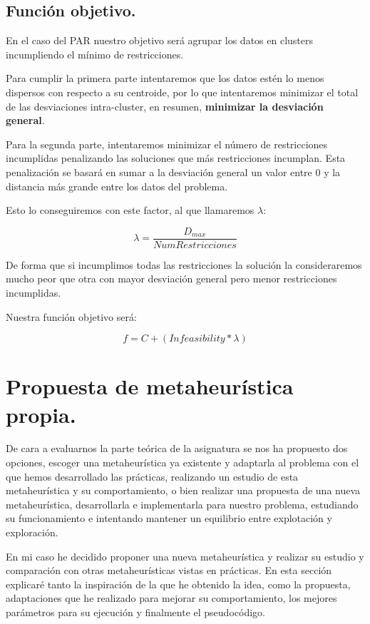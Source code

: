 \documentclass[12pt, spanish]{article}
\begin{document}
\subsection{Función objetivo.}

En el caso del PAR nuestro objetivo será agrupar los datos en clusters incumpliendo el mínimo de restricciones.

Para cumplir la primera parte intentaremos que los datos estén lo menos dispersos con respecto a su centroide, por lo que intentaremos minimizar el total de las desviaciones intra-cluster, en resumen, \textbf{minimizar la desviación general}.

Para la segunda parte, intentaremos minimizar el número de restricciones incumplidas penalizando las soluciones que más restricciones incumplan. Esta penalización se basará en sumar a la desviación general un valor entre 0 y la distancia más grande entre los datos del problema.

Esto lo conseguiremos con este factor, al que llamaremos $\lambda$:

$$ \lambda = \frac{D_{max}}{NumRestricciones} $$


De forma que si incumplimos todas las restricciones la solución la consideraremos mucho peor que otra con mayor desviación general pero menor restricciones incumplidas.

Nuestra función objetivo será:

$$ f = C + (\textit{Infeasibility} * \lambda) $$


\newpage

\section{Propuesta de metaheurística propia.}

De cara a evaluarnos la parte teórica de la asignatura se nos ha propuesto dos opciones, escoger una metaheurística ya existente y adaptarla al problema con el que hemos desarrollado las prácticas, realizando un estudio de esta metaheurística y su comportamiento, o bien realizar una propuesta de una nueva metaheurística, desarrollarla e implementarla para nuestro problema, estudiando su funcionamiento e intentando mantener un equilibrio entre explotación y exploración.

En mi caso he decidido proponer una nueva metaheurística y realizar su estudio y comparación con otras metaheurísticas vistas en prácticas. En esta sección explicaré tanto la inspiración de la que he obtenido la idea, como  la propuesta, adaptaciones que he realizado para mejorar su comportamiento, los mejores parámetros para su ejecución y finalmente el pseudocódigo.
\end{document}
